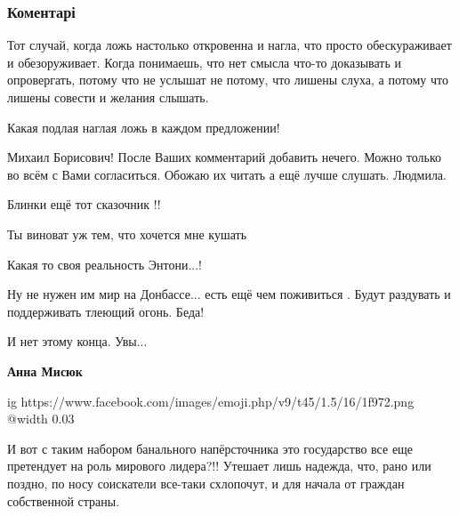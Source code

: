  
 
 
 
 
\subsubsection{Коментарі}

\begin{itemize} %

Тот случай, когда ложь настолько откровенна и нагла, что просто обескураживает
и обезоруживает. Когда понимаешь, что нет смысла что-то доказывать и
опровергать, потому что не услышат не потому, что лишены слуха, а потому что
лишены совести и желания слышать.


Какая подлая наглая ложь в каждом предложении!


Михаил Борисович! После Ваших комментарий добавить нечего. Можно только во всём
с Вами согласиться. Обожаю их читать а ещё лучше слушать. Людмила.

Блинки ещё тот сказочник !!

Ты виноват уж тем, что хочется мне кушать

Какая то своя реальность Энтони...!

Ну не нужен им мир на Донбассе... есть ещё чем поживиться . Будут раздувать и поддерживать тлеющий огонь. Беда!

\begin{itemize} %
И нет этому конца. Увы...

\textbf{Анна Мисюк}

\ifcmt
  ig https://www.facebook.com/images/emoji.php/v9/t45/1.5/16/1f972.png
  @width 0.03
\fi

\end{itemize} %


И вот с таким набором банального напёрсточника это государство все еще
претендует на роль мирового лидера?!! Утешает лишь надежда, что, рано или
поздно, по носу соискатели все-таки схлопочут, и для начала от граждан
собственной страны.



\end{itemize}
